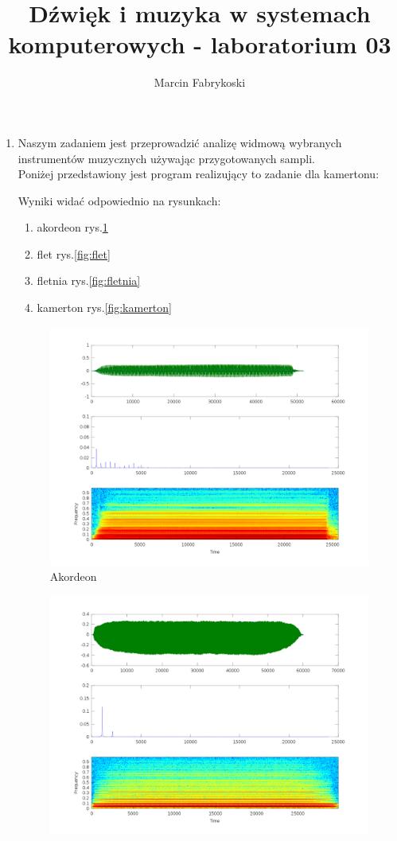 \documentclass[11pt,a4paper]{article}
\title{Dźwięk i muzyka w systemach komputerowych - laboratorium 03}
\author{Marcin Fabrykoski}
\date{}
\begin{document}
\maketitle
\newpage
\begin{enumerate}
\item Naszym zadaniem jest przeprowadzić analizę widmową wybranych instrumentów muzycznych używając przygotowanych sampli.\\
Poniżej przedstawiony jest program realizujący to zadanie dla kamertonu:

Wyniki widać odpowiednio na rysunkach:
\begin{enumerate}
\item akordeon rys.\ref{fig:akordeon}
\item flet rys.\ref{fig:flet}
\item fletnia rys.\ref{fig:fletnia}
\item kamerton rys.\ref{fig:kamerton}
\end{enumerate}
\begin{figure}
\hspace{-10em}
\includegraphics[scale=0.5]{proba1_akordeon.png}
\caption{Akordeon}
\label{fig:akordeon}
\end{figure}
\begin{figure}
\hspace{-10em}
\includegraphics[scale=0.5]{proba1_flet.png}

\end{figure}
\end{enumerate}
\end{document}

